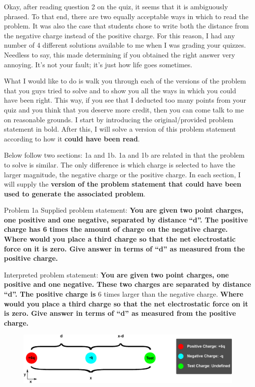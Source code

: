 \begin{homeworkProblem}
Okay, after reading question 2 on the quiz, it seems that it is ambiguously phrased. To that end, there are two equally acceptable ways in which to read the problem. It was also the case that students chose to write both the distance from the negative charge instead of the positive charge. For this reason, I had any number of 4 different solutions available to me when I was grading your quizzes. Needless to say, this made determining if you obtained the right answer very annoying. It's not your fault; it's just how life goes sometimes.


What I would like to do is walk you through each of the versions of the problem that you guys tried to solve and to show you all the ways in which you could have been right. This way, if you see that I deducted too many points from your quiz and you think that you deserve more credit, then you can come talk to me on reasonable grounds. I start by introducing the original/provided problem statement in bold. After this, I will solve a version of this problem statement according to how it \textbf{could have been read}.


Below follow two sections: 1a and 1b. 1a and 1b are related in that the problem to solve is similar. The only difference is which charge is selected to have the larger magnitude, the negative charge or the positive charge. In each section, I will supply the \textbf{version of the problem statement that could have been used to generate the associated problem}.

\begin{homeworkSection}{Problem 1a}
Supplied problem statement: \textbf{You are given two point charges, one positive and one negative, separated by distance  ``d''. The positive charge has 6 times the amount of charge on the negative charge. Where would you place a third charge so that the net electrostatic force on it is zero. Give answer in terms of ``d'' as measured from the positive charge.}


Interpreted problem statement: \textbf{You are given two point charges, one positive and one negative. These two charges are separated by distance ``d''. The positive charge is} 6 times larger than the negative charge. \textbf{Where would you place a third charge so that the net electrostatic force on it is zero. Give answer in terms of ``d'' as measured from the positive charge.}

\begin{figure}%
\centering
\includegraphics[width=\columnwidth]{1a.eps}%


\end{figure}
\end{homeworkSection}
\end{homeworkProblem}
